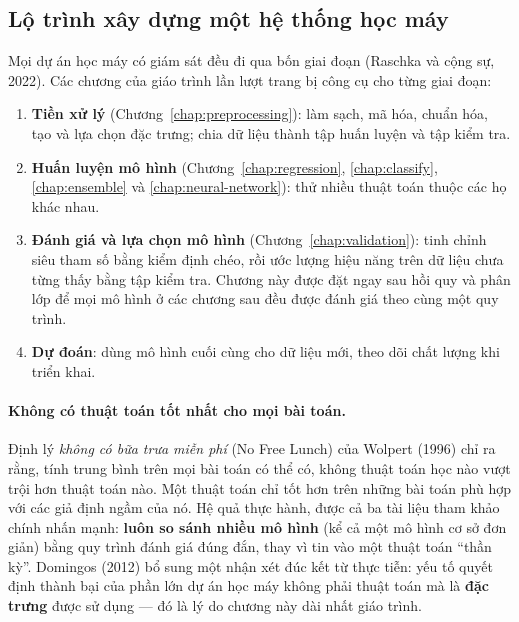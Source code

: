 \subsection{Lộ trình xây dựng một hệ thống học máy}

Mọi dự án học máy có giám sát đều đi qua bốn giai đoạn (Raschka và cộng sự, 2022). Các chương của giáo trình lần lượt trang bị công cụ cho từng giai đoạn:
\begin{enumerate}
    \item \textbf{Tiền xử lý} (Chương~\ref{chap:preprocessing}): làm sạch, mã hóa, chuẩn hóa, tạo và lựa chọn đặc trưng; chia dữ liệu thành tập huấn luyện và tập kiểm tra.
    \item \textbf{Huấn luyện mô hình} (Chương~\ref{chap:regression}, \ref{chap:classify}, \ref{chap:ensemble} và \ref{chap:neural-network}): thử nhiều thuật toán thuộc các họ khác nhau.
    \item \textbf{Đánh giá và lựa chọn mô hình} (Chương~\ref{chap:validation}): tinh chỉnh siêu tham số bằng kiểm định chéo, rồi ước lượng hiệu năng trên dữ liệu chưa từng thấy bằng tập kiểm tra. Chương này được đặt ngay sau hồi quy và phân lớp để mọi mô hình ở các chương sau đều được đánh giá theo cùng một quy trình.
    \item \textbf{Dự đoán}: dùng mô hình cuối cùng cho dữ liệu mới, theo dõi chất lượng khi triển khai.
\end{enumerate}


\paragraph{Không có thuật toán tốt nhất cho mọi bài toán.} Định lý \textit{không có bữa trưa miễn phí} (No Free Lunch) của Wolpert (1996) chỉ ra rằng, tính trung bình trên mọi bài toán có thể có, không thuật toán học nào vượt trội hơn thuật toán nào. Một thuật toán chỉ tốt hơn trên những bài toán phù hợp với các giả định ngầm của nó. Hệ quả thực hành, được cả ba tài liệu tham khảo chính nhấn mạnh: \textbf{luôn so sánh nhiều mô hình} (kể cả một mô hình cơ sở đơn giản) bằng quy trình đánh giá đúng đắn, thay vì tin vào một thuật toán ``thần kỳ''. Domingos (2012) bổ sung một nhận xét đúc kết từ thực tiễn: yếu tố quyết định thành bại của phần lớn dự án học máy không phải thuật toán mà là \textbf{đặc trưng} được sử dụng --- đó là lý do chương này dài nhất giáo trình.

